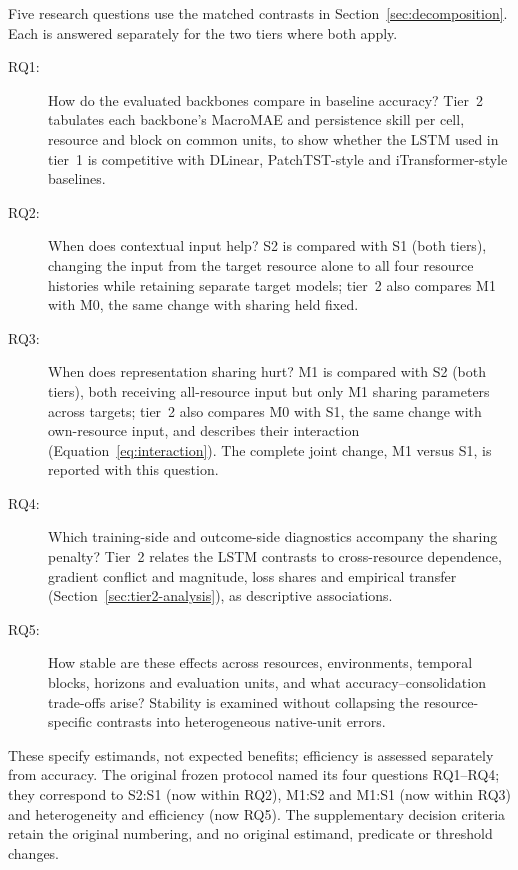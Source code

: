 \documentclass[a4paper,fleqn]{cas-dc}
\begin{document}
Five research questions use the matched contrasts in
Section~\ref{sec:decomposition}. Each is answered separately for the two
tiers where both apply.

\begin{description}
  \item[RQ1:] How do the evaluated backbones compare in baseline accuracy?
    Tier~2 tabulates each backbone's MacroMAE and persistence skill per cell,
    resource and block on common units, to show whether the LSTM used in
    tier~1 is competitive with DLinear, PatchTST-style and
    iTransformer-style baselines.
  \item[RQ2:] When does contextual input help? S2 is compared with S1 (both
    tiers), changing the input from the target resource alone to all four
    resource histories while retaining separate target models; tier~2 also
    compares M1 with M0, the same change with sharing held fixed.
  \item[RQ3:] When does representation sharing hurt? M1 is compared with S2
    (both tiers), both receiving all-resource input but only M1 sharing
    parameters across targets; tier~2 also compares M0 with S1, the same
    change with own-resource input, and describes their interaction
    (Equation~\ref{eq:interaction}). The complete joint change, M1 versus S1,
    is reported with this question.
  \item[RQ4:] Which training-side and outcome-side diagnostics accompany the
    sharing penalty? Tier~2 relates the LSTM contrasts to cross-resource
    dependence, gradient conflict and magnitude, loss shares and empirical
    transfer (Section~\ref{sec:tier2-analysis}), as descriptive associations.
  \item[RQ5:] How stable are these effects across resources, environments,
    temporal blocks, horizons and evaluation units, and what
    accuracy--consolidation trade-offs arise? Stability is examined without
    collapsing the resource-specific contrasts into heterogeneous native-unit
    errors.
\end{description}

These specify estimands, not expected benefits; efficiency is assessed
separately from accuracy. The original frozen protocol named its four
questions RQ1--RQ4; they correspond to S2:S1 (now within RQ2), M1:S2 and
M1:S1 (now within RQ3) and heterogeneity and efficiency (now RQ5). The
supplementary decision criteria retain the original numbering, and no
original estimand, predicate or threshold changes.
\end{document}
